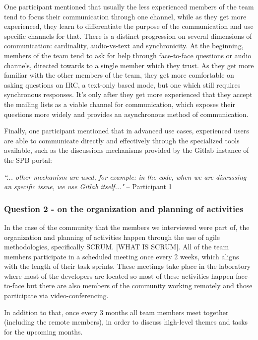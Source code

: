 \documentclass{sigchi}
\begin{document}
One participant mentioned that usually the less experienced members of the team tend to focus their communication through one channel, while as they get more experienced, they learn to differentiate the purpose of the communication and use specific channels for that. There is a distinct progression on several dimensions of communication: cardinality, audio-vs-text and synchronicity. At the beginning, members of the team tend to ask for help through face-to-face questions or audio channels, directed towards to a single member which they trust. As they get more familiar with the other members of the team, they get more comfortable on asking questions on IRC, a text-only based mode, but one which still requires synchronous responses. It's only after they get more experienced that they accept the mailing lists as a viable channel for communication, which exposes their questions more widely and provides an asynchronous method of communication.

Finally, one participant mentioned that in advanced use cases, experienced users are able to communicate directly and effectively through the specialized tools available, such as the discussions mechanisms provided by the Gitlab instance of the SPB portal:

\begin{displayquote}
\textit{``... other mechanism are used, for example: in the code, when we are discussing an specific issue, we use Gitlab itself..."} – Participant 1
\end{displayquote}

\subsubsection{Question 2 - on the organization and planning of activities}
In the case of the community that the members we interviewed were part of, the organization and planning of activities happen through the use of agile methodologies, specifically SCRUM. [WHAT IS SCRUM]. All of the team members participate in a scheduled meeting once every 2 weeks, which aligns with the length of their task sprints. These meetings take place in the laboratory where most of the developers are located so most of these activities happen face-to-face but there are also members of the community working remotely and those participate via video-conferencing.

In addition to that, once every 3 months all team members meet together (including the remote members), in order to discuss high-level themes and tasks for the upcoming months.
\end{document}
